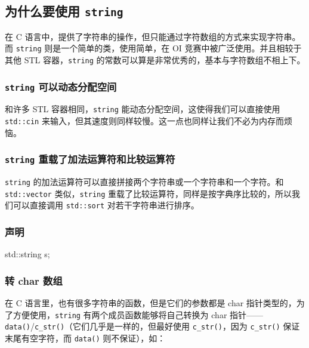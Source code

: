 \subsection{\texorpdfstring{为什么要使用 \texttt{string}}{为什么要使用 string}}\label{ux4e3aux4ec0ux4e48ux8981ux4f7fux7528-string}

在 C 语言中，提供了字符串的操作，但只能通过字符数组的方式来实现字符串。而 \texttt{string} 则是一个简单的类，使用简单，在 OI 竞赛中被广泛使用。并且相较于其他 STL 容器，\texttt{string} 的常数可以算是非常优秀的，基本与字符数组不相上下。

\subsubsection{\texorpdfstring{\texttt{string} 可以动态分配空间}{string 可以动态分配空间}}\label{string-ux53efux4ee5ux52a8ux6001ux5206ux914dux7a7aux95f4}

和许多 STL 容器相同，\texttt{string} 能动态分配空间，这使得我们可以直接使用 \texttt{std::cin} 来输入，但其速度则同样较慢。这一点也同样让我们不必为内存而烦恼。

\subsubsection{\texorpdfstring{\texttt{string} 重载了加法运算符和比较运算符}{string 重载了加法运算符和比较运算符}}\label{string-ux91cdux8f7dux4e86ux52a0ux6cd5ux8fd0ux7b97ux7b26ux548cux6bd4ux8f83ux8fd0ux7b97ux7b26}

\texttt{string} 的加法运算符可以直接拼接两个字符串或一个字符串和一个字符。和 \texttt{std::vector} 类似，\texttt{string} 重载了比较运算符，同样是按字典序比较的，所以我们可以直接调用 \texttt{std::sort} 对若干字符串进行排序。

\subsubsection{声明}\label{ux58f0ux660e}


\begin{codeline}
std::string s;
\end{codeline}


\subsubsection{转 char 数组}\label{ux8f6c-char-ux6570ux7ec4}

在 C 语言里，也有很多字符串的函数，但是它们的参数都是 char 指针类型的，为了方便使用，\texttt{string} 有两个成员函数能够将自己转换为 char 指针------\texttt{data()}/\texttt{c\_str()}（它们几乎是一样的，但最好使用 \texttt{c\_str()}，因为 \texttt{c\_str()} 保证末尾有空字符，而 \texttt{data()} 则不保证），如：


